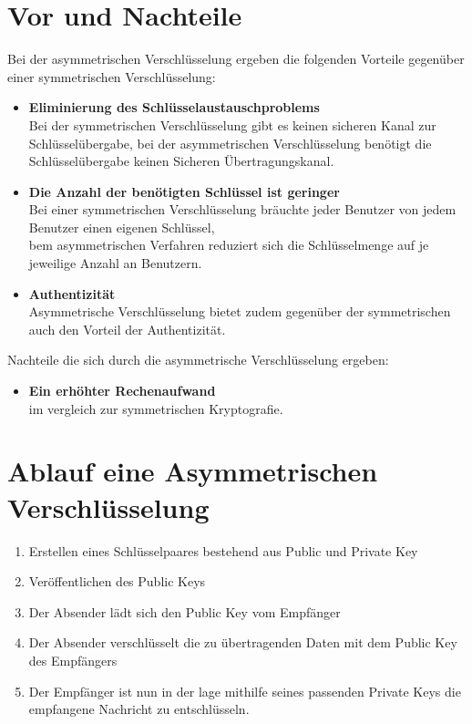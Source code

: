 \section{Vor und Nachteile}
Bei der asymmetrischen Verschlüsselung ergeben die folgenden Vorteile gegenüber einer symmetrischen Verschlüsselung:
\begin{itemize}
    \item \textbf{Eliminierung des Schlüsselaustauschproblems} \\ Bei der symmetrischen Verschlüsselung gibt es keinen sicheren Kanal zur Schlüsselübergabe, bei der asymmetrischen Verschlüsselung benötigt die Schlüsselübergabe keinen Sicheren Übertragungskanal.\citep{paar:2016}
    \item \textbf{Die Anzahl der benötigten Schlüssel ist geringer} \\ Bei einer symmetrischen Verschlüsselung bräuchte jeder Benutzer von jedem Benutzer einen eigenen Schlüssel,
    \\bem asymmetrischen Verfahren reduziert sich die Schlüsselmenge auf je jeweilige Anzahl an Benutzern.\citep{paar:2016}
    \item \textbf{Authentizität} \\ Asymmetrische Verschlüsselung bietet zudem gegenüber der symmetrischen auch den Vorteil der Authentizität.
\end{itemize}
Nachteile die sich durch die asymmetrische Verschlüsselung ergeben:

\begin{itemize}
    \item \textbf{Ein erhöhter Rechenaufwand} \\ im vergleich zur symmetrischen Kryptografie.
\end{itemize}

\section{Ablauf eine Asymmetrischen Verschlüsselung}
\begin{enumerate}
    \item Erstellen eines Schlüsselpaares bestehend aus Public und Private Key
    \item Veröffentlichen des Public Keys
    \item Der Absender lädt sich den Public Key vom Empfänger
    \item Der Absender verschlüsselt die zu übertragenden Daten mit dem Public Key des Empfängers
    \item Der Empfänger ist nun in der lage mithilfe seines passenden Private Keys die empfangene Nachricht zu entschlüsseln.
\end{enumerate}

